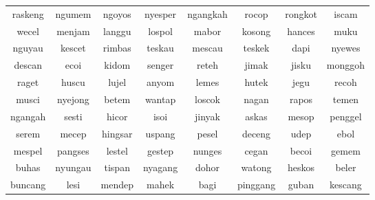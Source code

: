 \documentclass{article}
\begin{document}
\begin{center}
\begin{tabular}{c c c c c c c c}
    \toprule
    raskeng & ngumem  & ngoyos  & nyesper & ngangkah & rocop    & rongkot & iscam   \\
     wecel  & menjam  & langgu  & lospol  & mabor    & kosong   & hances  & muku    \\
    nguyau  & kescet  & rimbas  & teskau  & mescau   & teskek   & dapi    & nyewes  \\
    descan  & ecoi    & kidom   & senger  & reteh    & jimak    & jisku   & monggoh \\
     raget  & huscu   & lujel   & anyom   & lemes    & hutek    & jegu    & recoh   \\
     musci  & nyejong & betem   & wantap  & loscok   & nagan    & rapos   & temen   \\
    ngangah & sesti   & hicor   & isoi    & jinyak   & askas    & mesop   & penggel \\
     serem  & mecep   & hingsar & uspang  & pesel    & deceng   & udep    & ebol    \\
    mespel  & pangses & lestel  & gestep  & nunges   & cegan    & becoi   & gemem   \\
     buhas  & nyungau & tispan  & nyagang & dohor    & watong   & heskos  & beler   \\
    buncang & lesi    & mendep  & mahek   & bagi     & pinggang & guban   & kescang \\ \bottomrule
\end{tabular}
\end{center}
\end{document}
